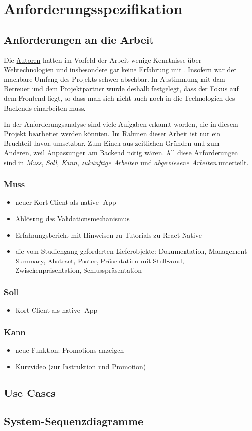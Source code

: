 \chapter{Anforderungsspezifikation}
\label{pd-anforderungsspezifikation}

\section{Anforderungen an die Arbeit} 
Die \hyperref[pm-team]{Autoren} hatten im Vorfeld der Arbeit wenige Kenntnisse über Webtechnologien und insbesondere gar keine Erfahrung mit .
Insofern war der machbare Umfang des Projekts schwer absehbar.
In Abstimmung mit dem \hyperref[pm-team]{Betreuer} und dem \hyperref[pm-team]{Projektpartner} wurde deshalb festgelegt, dass der Fokus auf dem Frontend liegt, so dass man sich nicht auch noch in die Technologien des Backends einarbeiten muss.

In der Anforderungsanalyse sind viele Aufgaben erkannt worden, die in diesem Projekt bearbeitet werden könnten. 
Im Rahmen dieser Arbeit ist nur ein Bruchteil davon umsetzbar.
Zum Einen aus zeitlichen Gründen und zum Anderen, weil Anpassungen am Backend nötig wären.
All diese Anforderungen sind in \emph{Muss}, \emph{Soll}, \emph{Kann}, \emph{zukünftige Arbeiten} und \emph{abgewiesene Arbeiten} unterteilt.

\subsection{Muss}
\begin{itemize}
	\item neuer Kort-Client als native -App
	\item Ablösung des Validationsmechanismus
	\item Erfahrungsbericht mit Hinweisen zu Tutorials zu React Native
	\item die vom Studiengang geforderten Lieferobjekte: Dokumentation, Management Summary, Abstract, Poster, Präsentation mit Stellwand, Zwischenpräsentation, Schlusspräsentation
\end{itemize}

\subsection{Soll}
\begin{itemize}
	\item Kort-Client als native -App
\end{itemize}

\subsection{Kann}
\begin{itemize}
	\item neue Funktion: Promotions anzeigen
	\item Kurzvideo (zur Instruktion und Promotion)
\end{itemize}


\section{Use Cases}


\section{System-Sequenzdiagramme}

